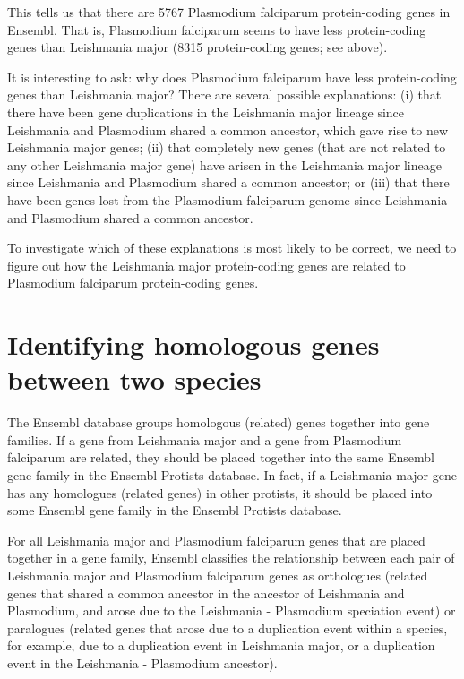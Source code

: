 \documentclass[
]{book}
\begin{document}
This tells us that there are 5767 Plasmodium falciparum protein-coding genes in Ensembl. That is, Plasmodium falciparum seems to have less protein-coding genes than Leishmania major (8315 protein-coding genes; see above).

It is interesting to ask: why does Plasmodium falciparum have less protein-coding genes than Leishmania major? There are several possible explanations: (i) that there have been gene duplications in the Leishmania major lineage since Leishmania and Plasmodium shared a common ancestor, which gave rise to new Leishmania major genes; (ii) that completely new genes (that are not related to any other Leishmania major gene) have arisen in the Leishmania major lineage since Leishmania and Plasmodium shared a common ancestor; or (iii) that there have been genes lost from the Plasmodium falciparum genome since Leishmania and Plasmodium shared a common ancestor.

To investigate which of these explanations is most likely to be correct, we need to figure out how the Leishmania major protein-coding genes are related to Plasmodium falciparum protein-coding genes.

\hypertarget{identifying-homologous-genes-between-two-species}{%
\chapter{Identifying homologous genes between two species}\label{identifying-homologous-genes-between-two-species}}

The Ensembl database groups homologous (related) genes together into gene families. If a gene from Leishmania major and a gene from Plasmodium falciparum are related, they should be placed together into the same Ensembl gene family in the Ensembl Protists database. In fact, if a Leishmania major gene has any homologues (related genes) in other protists, it should be placed into some Ensembl gene family in the Ensembl Protists database.

For all Leishmania major and Plasmodium falciparum genes that are placed together in a gene family, Ensembl classifies the relationship between each pair of Leishmania major and Plasmodium falciparum genes as orthologues (related genes that shared a common ancestor in the ancestor of Leishmania and Plasmodium, and arose due to the Leishmania - Plasmodium speciation event) or paralogues (related genes that arose due to a duplication event within a species, for example, due to a duplication event in Leishmania major, or a duplication event in the Leishmania - Plasmodium ancestor).
\end{document}
